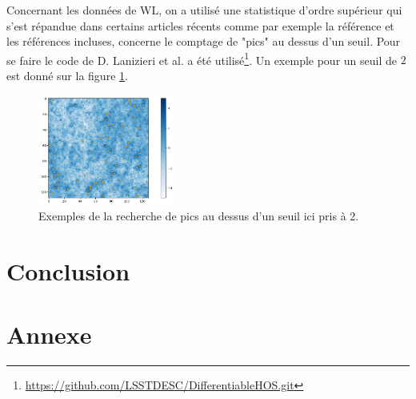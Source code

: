 \documentclass[12pt,twoside]{article}
\begin{document}
Concernant les données de WL, on a utilisé une statistique d'ordre supérieur qui s'est répandue dans certains articles récents comme par exemple la référence \citep{2023arXiv230507531L} et les références incluses, concerne le comptage de "pics" au dessus d'un seuil. Pour se faire le code de D. Lanizieri et al. a été utilisé\footnote{\url{https://github.com/LSSTDESC/DifferentiableHOS.git}}. Un exemple pour un seuil de $2$ est donné sur la figure \ref{fig-WL-peakcount-thr2-exemple}.
\begin{figure}
\centering
\includegraphics[width=0.4\textwidth]{fig-WL-peakcount-thr2-exemple.png}
\caption{Exemples de la recherche de pics au dessus d'un seuil ici pris à 2.}
\label{fig-WL-peakcount-thr2-exemple}
\end{figure}





 


 
%
\section{Conclusion}
% 
\section{Annexe}


\newpage


\end{document}
